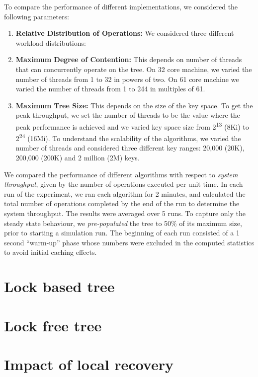 To compare the performance of different implementations, we considered the following parameters:
\begin{enumerate}[leftmargin=*, noitemsep]
\item \textbf{Relative Distribution of Operations:} We considered three different workload  distributions: 
\item \textbf{Maximum Degree of Contention:} This depends on number of threads that can concurrently operate on the tree. On 32 core machine, we varied the number of threads 
from 1 to 32 in powers of two. On 61 core machine we varied the number of threads from 1 to 244 in multiples of 61.
\item \textbf{Maximum Tree Size:} This depends on the size of the key space. To get the peak throughput, we set the number of threads to be the value where the peak performance is achieved and we varied key space size from 2\textsuperscript{13} (8Ki) to 2\textsuperscript{24} (16Mi).  To understand the scalability of the algorithms, we varied the number of threads and considered three different key ranges: 20,000 (20K), 200,000 (200K) and 2 million (2M) keys.
\end{enumerate}

We compared the performance of different algorithms with respect to \emph{system throughput}, given by the number of operations executed per unit time. In each run of the experiment, we ran each algorithm for 2 minutes, and calculated the total number of operations completed by the end of the run to determine the system throughput. The results were averaged over 5 runs. To capture only the steady state behaviour, we \textit{pre-populated} the tree to 50\% of its maximum size, prior to starting a simulation run. The beginning of each run consisted of a 1 second ``warm-up'' phase whose numbers were excluded in the computed statistics to avoid initial caching effects. 

\section{Lock based tree}
\label{sec:experiments:castle}

\section{Lock free tree}
\label{sec:experiments:icdcn}

\section{Impact of local recovery}
\label{sec:experiments:localRecovery}

%